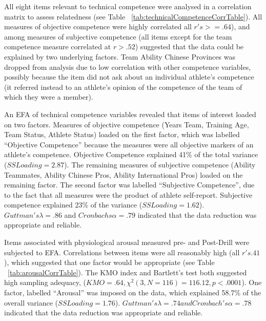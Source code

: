 All eight items relevant to technical competence were analysed in a correlation matrix to assess relatedness (see Table ~\ref{tab:technicalCompetenceCorrTable}). All measures of objective competence were highly correlated all $r's >= .64$),  and among measures of subjective competence (all items except for the team competence measure correlated at $r > .52$) suggested that the data could be explained by two underlying factors. Team Ability Chinese Provinces was dropped from analysis due to low correlation with other competence variables, possibly because the item did not ask about an individual athlete’s competence (it referred instead to an athlete’s opinion of the competence of the team of which they were a member).

An EFA of technical competence variables revealed that items of interest loaded on two factors. Measures of objective competence (Years Team, Training Age, Team Status, Athlete Status) loaded on the first factor, which was labelled ``Objective Competence'' because the measures were all objective markers of an athlete's competence.
Objective Competence explained 41\% of the total variance ($SS Loading = 2.87$).  The remaining measures of subjective competence (Ability Teammates, Ability Chinese Pros, Ability International Pros) loaded on the remaining factor.  The second factor was labelled ``Subjective Competence'', due to the fact that all measures were the product of athlete self-report.  Subjective competence explained 23\% of the variance ($SS Loading = 1.62$).  $Guttman's \lambda = .86$ and $Cronbachs \alpha = .79$ indicated that the data reduction was appropriate and reliable.

Items associated with physiological arousal measured pre- and Post-Drill were subjected to EFA.
Correlations between items were all reasonably high (all $r's  .41$), which suggested that one factor would be appropriate (see Table ~\ref{tab:arousalCorrTable}). The KMO index and Bartlett's test both suggested high sampling adequacy, ($KMO = .64, \chi^2(3, N = 116) = 116.12, p < .0001$).  One factor, labelled ``Arousal'' was imposed on the data, which explained 58.7\% of the overall variance ($SS Loading = 1.76$).  $Guttman's \lambda = .74 and  Cronbach's \alpha = .78$  indicated that the data reduction was appropriate and reliable.












